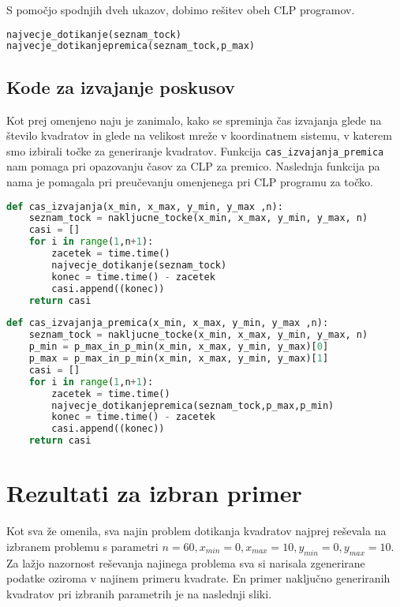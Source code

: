 \documentclass[a4paper]{article}
\begin{document}
S pomočjo spodnjih dveh ukazov, dobimo rešitev obeh CLP programov.

\begin{lstlisting}[language=Python]
najvecje_dotikanje(seznam_tock)
najvecje_dotikanjepremica(seznam_tock,p_max)
\end{lstlisting}

\subsection{Kode za izvajanje poskusov}

Kot prej omenjeno naju je zanimalo, kako se spreminja čas izvajanja glede na število kvadratov in glede na velikost mreže v koordinatnem sistemu, v katerem smo izbirali točke za generiranje kvadratov. Funkcija \texttt{cas\_izvajanja\_premica} nam pomaga pri opazovanju časov za CLP za premico. Naslednja funkcija pa nama je pomagala pri preučevanju omenjenega pri CLP programu za točko.

\begin{lstlisting}[language=Python]
def cas_izvajanja(x_min, x_max, y_min, y_max ,n):
    seznam_tock = nakljucne_tocke(x_min, x_max, y_min, y_max, n)
    casi = []
    for i in range(1,n+1):
        zacetek = time.time()
        najvecje_dotikanje(seznam_tock)
        konec = time.time() - zacetek
        casi.append((konec))
    return casi
\end{lstlisting}

\begin{lstlisting}[language=Python]
def cas_izvajanja_premica(x_min, x_max, y_min, y_max ,n):
    seznam_tock = nakljucne_tocke(x_min, x_max, y_min, y_max, n)
    p_min = p_max_in_p_min(x_min, x_max, y_min, y_max)[0]
    p_max = p_max_in_p_min(x_min, x_max, y_min, y_max)[1]
    casi = []
    for i in range(1,n+1):
        zacetek = time.time()
        najvecje_dotikanjepremica(seznam_tock,p_max,p_min)
        konec = time.time() - zacetek
        casi.append((konec))
    return casi
\end{lstlisting}

\section{Rezultati za izbran primer}

Kot sva že omenila, sva najin problem dotikanja kvadratov najprej reševala na izbranem problemu s parametri $n = 60, x_{min} = 0, x_{max} = 10, y_{min} = 0, y_{max} = 10.$  Za lažjo nazornost reševanja najinega problema sva si narisala zgenerirane podatke oziroma v najinem primeru kvadrate. En primer naključno generiranih kvadratov pri izbranih parametrih je na naslednji sliki.
\end{document}
